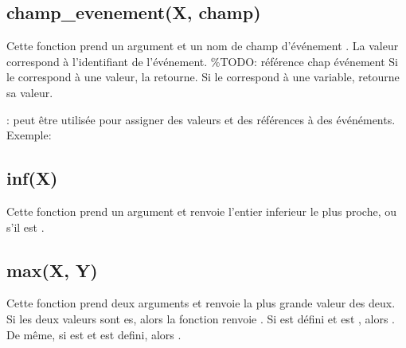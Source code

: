 \documentclass[letterpaper,10pt,french]{sphinxmanual}
\begin{document}
\subsection{champ\_evenement(X, champ)}
\label{\detokenize{fonctions:champ-evenement-x-champ}}
\sphinxAtStartPar
Cette fonction prend un argument  et un nom de champ d’événement .
La valeur  correspond à l’identifiant de l’événement. \%TODO: référence chap événement
Si le  correspond à une valeur,  la retourne. Si
le  correspond à une variable,  retourne sa valeur.

\sphinxAtStartPar
{} :  peut être utilisée pour assigner des valeurs et
des références à des événéments. Exemple:

\begin{sphinxVerbatim}[commandchars=\\\{\}]
  
  

   
   
\end{sphinxVerbatim}


\subsection{inf(X)}
\label{\detokenize{fonctions:inf-x}}
\sphinxAtStartPar
Cette fonction prend un argument et renvoie l’entier inferieur
le plus proche, ou  s’il est .


\subsection{max(X, Y)}
\label{\detokenize{fonctions:max-x-y}}
\sphinxAtStartPar
Cette fonction prend deux arguments et renvoie la plus grande
valeur des deux.
Si les deux valeurs sont es, alors la fonction renvoie
.
Si  est défini et  est , alors . De même,
si  est  et  est defini, alors .
\end{document}

